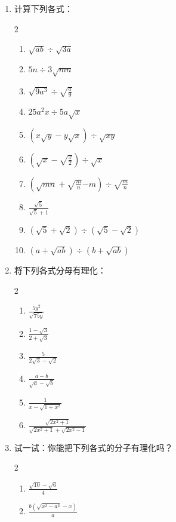 \begin{ex}
\begin{enumerate}
    \item 计算下列各式：
\begin{multicols}{2}
\begin{enumerate}
    \item $\sqrt{ab}\div \sqrt{3a}$
    \item $5n\div 3\sqrt{mn}$
\item $\sqrt{9a^3}\div \sqrt{\frac{a}{9}}$
\item $25a^2x\div 5a\sqrt{x}$
\item  $\left(x\sqrt{y}-y\sqrt{x}\right)\div \sqrt{xy}$
\item $\left(\sqrt{x}-\sqrt{\frac{x}{2}}\right)\div \sqrt{x}$
\item $\left(\sqrt{mn}+\sqrt{\frac{m}{n}}{-m}\right)\div \sqrt{\frac{m}{n}}$
\item $\frac{\sqrt{5}}{\sqrt{5}+1}$
\item $(\sqrt{5}+\sqrt{2})\div (\sqrt{5}-\sqrt{2})$
\item $(a+\sqrt{ab})\div (b+\sqrt{ab})$
\end{enumerate}    
\end{multicols}

    \item 将下列各式分母有理化：
    \begin{multicols}{2}
\begin{enumerate}
\item $\frac{5y^2}{\sqrt{75y}}$
\item $\frac{1-\sqrt{3}}{2+\sqrt{3}}$
\item $\frac{5}{2\sqrt{3}-\sqrt{2}}$
\item $\frac{a-b}{\sqrt{a}-\sqrt{b}}$
\item $\frac{1}{x-\sqrt{1+x^2}}$
\item $\frac{\sqrt{2x^2+1}}{\sqrt{2x^2+1}+\sqrt{2x^2-1}}$
\end{enumerate}    
\end{multicols}

    \item 试一试：你能把下列各式的分子有理化吗？
    \begin{multicols}{2}
        \begin{enumerate}
        \item  $\frac{\sqrt{10}-\sqrt{6}}{4}$
        \item $\frac{b(\sqrt{x^2-a^2}-x)}{a}$
        \end{enumerate}    
        \end{multicols}
\end{enumerate}    
\end{ex}


